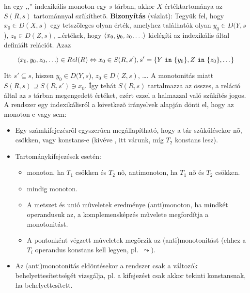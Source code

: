 
\tetel ha egy ,,'' indexikális monoton egy $s$ tárban, akkor
$X$ értéktartománya az $S(R,s)$ tartománnyal szûkíthetõ.
\br
{\bf Bizonyítás} (vázlat): Tegyük fel, hogy $x_0 \in D(X,s)$ egy tetszõleges olyan
érték, amelyhez találhatók olyan $y_0 \in D(Y,s$), $z_0 \in D(Z,s)$, \ldots értékek, hogy 
$\left\langle x_0,y_0,z_0,\ldots\right\rangle$ kielégíti az indexikális által definiált relációt. Azaz

\[ \left\langle x_0,y_0,z_0,\ldots\right\rangle \in Rel(R) \Leftrightarrow x_0 \in S(R, s'), 
s'= \{Y~\texttt{in}~\{y_0\},Z~\texttt{in}~\{z_0\},\ldots\} \]

Itt $s' \subseteq s$, hiszen $y_0 \in D(Y,s$), $z_0 \in D(Z,s)$,
\ldots. A monotonitás miatt $S(R, s)
\supseteq S(R, s') \ni x_0$. Így tehát $S(R, s)$ tartalmazza az összes, a
reláció által az $s$ tárban megengedett értéket, ezért ezzel a halmazzal
való szûkítés jogos.
\br
A \clpfd rendszer egy indexikálisról a következõ irányelvek alapján dönti el, hogy
az monoton-e vagy sem:

\begin{itemize}
\item Egy számkifejezésrõl egyszerûen megállapítható, hogy a tár
szûkülésekor nõ, csökken, vagy konstans-e (kivéve , itt
várunk, míg $T_2$ konstans lesz).
\item Tartománykifejezések esetén:
\begin{itemize}
\item {} monoton, ha $T_1$ csökken és $T_2$ nõ, antimonoton,
 ha $T_1$ nõ és $T_2$ csökken.
\item {} mindig monoton.
\item A metszet és unió mûveletek eredménye (anti)monoton, ha mindkét
operandusuk az, a komplemensképzés mûvelete megfordítja a monotonitást.
\item A pontonként végzett mûveletek megõrzik az (anti)monotonitást (ehhez a
$T_i$ operandus konstans kell legyen, pl.\ $\leadsto$).
\end{itemize}
\item Az (anti)monotonitás eldöntésekor a rendszer csak a változók behelyettesítettségét
vizsgálja, pl. a  kifejezést csak akkor tekinti
konstansnak, ha  behelyettesített.
\end{itemize}

